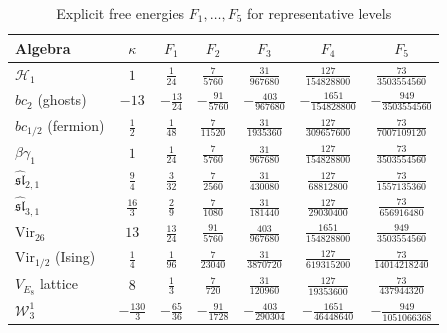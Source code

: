 \begin{table}[ht]
\centering
\caption{Explicit free energies $F_1, \ldots, F_5$
for representative levels}
\label{tab:genus-expansion-values}
\renewcommand{\arraystretch}{1.5}
{\footnotesize
\begin{tabular}{|l|c|c|c|c|c|c|}
\hline
\textbf{Algebra} & $\kappa$ & $F_1$ & $F_2$ & $F_3$ & $F_4$ & $F_5$ \\
\hline
$\mathcal{H}_1$
  & $1$ & $\frac{1}{24}$ & $\frac{7}{5760}$ & $\frac{31}{967680}$
  & $\frac{127}{154828800}$ & $\frac{73}{3503554560}$ \\
\hline
$bc_2$ (ghosts)
  & $-13$ & $-\frac{13}{24}$ & $-\frac{91}{5760}$ & $-\frac{403}{967680}$
  & $-\frac{1651}{154828800}$ & $-\frac{949}{3503554560}$ \\[2pt]
\hline
$bc_{1/2}$ (fermion)
  & $\frac{1}{2}$ & $\frac{1}{48}$ & $\frac{7}{11520}$ & $\frac{31}{1935360}$
  & $\frac{127}{309657600}$ & $\frac{73}{7007109120}$ \\[4pt]
\hline
$\beta\gamma_1$
  & $1$ & $\frac{1}{24}$ & $\frac{7}{5760}$ & $\frac{31}{967680}$
  & $\frac{127}{154828800}$ & $\frac{73}{3503554560}$ \\
\hline
$\widehat{\mathfrak{sl}}_{2,1}$
  & $\frac{9}{4}$ & $\frac{3}{32}$ & $\frac{7}{2560}$ & $\frac{31}{430080}$
  & $\frac{127}{68812800}$ & $\frac{73}{1557135360}$ \\[4pt]
\hline
$\widehat{\mathfrak{sl}}_{3,1}$
  & $\frac{16}{3}$ & $\frac{2}{9}$ & $\frac{7}{1080}$ & $\frac{31}{181440}$
  & $\frac{127}{29030400}$ & $\frac{73}{656916480}$ \\[4pt]
\hline
$\mathrm{Vir}_{26}$
  & $13$ & $\frac{13}{24}$ & $\frac{91}{5760}$ & $\frac{403}{967680}$
  & $\frac{1651}{154828800}$ & $\frac{949}{3503554560}$ \\
\hline
$\mathrm{Vir}_{1/2}$ (Ising)
  & $\frac{1}{4}$ & $\frac{1}{96}$ & $\frac{7}{23040}$ & $\frac{31}{3870720}$
  & $\frac{127}{619315200}$ & $\frac{73}{14014218240}$ \\[4pt]
\hline
$V_{E_8}$ lattice
  & $8$ & $\frac{1}{3}$ & $\frac{7}{720}$ & $\frac{31}{120960}$
  & $\frac{127}{19353600}$ & $\frac{73}{437944320}$ \\
\hline
$\mathcal{W}_3^1$
  & $-\frac{130}{3}$ & $-\frac{65}{36}$ & $-\frac{91}{1728}$ & $-\frac{403}{290304}$
  & $-\frac{1651}{46448640}$ & $-\frac{949}{1051066368}$ \\[4pt]
\hline
\end{tabular}
}
\end{table}

